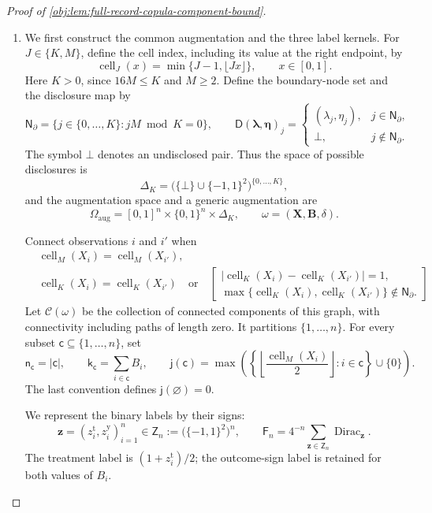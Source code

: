 \documentclass[11pt]{article}
\begin{document}
\begin{proof}[Proof of \cref{obj:lem:full-record-copula-component-bound}]
\begin{enumerate}
\item
We first construct the common augmentation and the three label kernels. For \(J\in\{K,M\}\), define the cell index, including its value at the right endpoint, by
\[
\operatorname{cell}_J(x)=\min\{J-1,\lfloor Jx\rfloor\},
\qquad x\in[0,1].
\]
Here \(K>0\), since \(16M\le K\) and \(M\ge2\). Define the boundary-node set and the disclosure map by
\[
\mathsf N_{\partial}
 =\{j\in\{0,\ldots,K\}:jM\bmod K=0\},
\qquad
\mathsf D(\boldsymbol\lambda,\boldsymbol\eta)_j
 =
 \begin{cases}
 (\lambda_j,\eta_j),&j\in\mathsf N_{\partial},\\
 \bot,&j\notin\mathsf N_{\partial}.
 \end{cases}
\]
The symbol \(\bot\) denotes an undisclosed pair. Thus the space of possible disclosures is
\[
\mathsf\Delta_K
 =\bigl(\{\bot\}\cup\{-1,1\}^2\bigr)^{\{0,\ldots,K\}},
\]
and the augmentation space and a generic augmentation are
\[
\mathsf\Omega_{\mathrm{aug}}
 =[0,1]^n\times\{0,1\}^n\times\mathsf\Delta_K,
\qquad
\omega=(\mathbf X,\mathbf B,\delta).
\]

Connect observations \(i\) and \(i'\) when
\[
\begin{aligned}
&\operatorname{cell}_M(X_i)=\operatorname{cell}_M(X_{i'}),\\
&\operatorname{cell}_K(X_i)=\operatorname{cell}_K(X_{i'})
\quad\text{or}\quad
\left[
\begin{array}{c}
|\operatorname{cell}_K(X_i)-\operatorname{cell}_K(X_{i'})|=1,\\
\max\{\operatorname{cell}_K(X_i),\operatorname{cell}_K(X_{i'})\}
 \notin\mathsf N_{\partial}.
\end{array}
\right]
\end{aligned}
\]
Let \(\mathscr C(\omega)\) be the collection of connected components of this graph, with connectivity including paths of length zero. It partitions \(\{1,\ldots,n\}\). For every subset \(\mathsf c\subseteq\{1,\ldots,n\}\), set
\[
\mathsf n_{\mathsf c}=|\mathsf c|,
\qquad
\mathsf k_{\mathsf c}=\sum_{i\in\mathsf c}B_i,
\qquad
\mathsf j(\mathsf c)
 =\max\left(
 \left\{\left\lfloor\frac{\operatorname{cell}_M(X_i)}2\right\rfloor:
 i\in\mathsf c\right\}\cup\{0\}\right).
\]
The last convention defines \(\mathsf j(\varnothing)=0\).

We represent the binary labels by their signs:
\[
\mathbf z=(z_i^{\mathrm t},z_i^{\mathrm y})_{i=1}^n
 \in\mathsf Z_n:=\bigl(\{-1,1\}^2\bigr)^n,
\qquad
\mathsf F_n
 =4^{-n}\sum_{\mathbf z\in\mathsf Z_n}
       \operatorname{Dirac}_{\mathbf z}.
\]
The treatment label is \((1+z_i^{\mathrm t})/2\); the outcome-sign label is retained for both values of \(B_i\).


\end{enumerate}
\end{proof}
\end{document}
